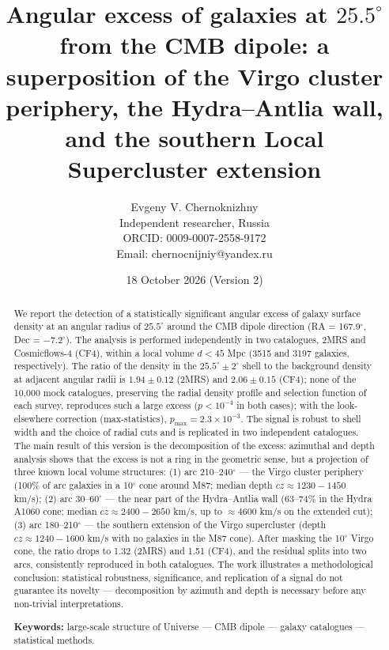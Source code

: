 \documentclass[11pt,a4paper]{article}
\title{\bfseries Angular excess of galaxies at \(25.5^\circ\) from the CMB dipole: a superposition of the Virgo cluster periphery, the Hydra--Antlia wall, and the southern Local Supercluster extension}
\author{Evgeny V. Chernoknizhny \\
\small Independent researcher, Russia \\
\small ORCID: 0009-0007-2558-9172 \\
\small Email: chernocnijniy@yandex.ru}
\date{18 October 2026 (Version 2)}
\begin{document}
\maketitle

\begin{abstract}
We report the detection of a statistically significant angular excess of galaxy surface density at an angular radius of \(25.5^\circ\) around the CMB dipole direction (RA = 167.9\(^\circ\), Dec = \(-7.2^\circ\)). The analysis is performed independently in two catalogues, 2MRS and Cosmicflows-4 (CF4), within a local volume \(d < 45\) Mpc (3515 and 3197 galaxies, respectively). The ratio of the density in the \(25.5^\circ \pm 2^\circ\) shell to the background density at adjacent angular radii is \(1.94 \pm 0.12\) (2MRS) and \(2.06 \pm 0.15\) (CF4); none of the 10,000 mock catalogues, preserving the radial density profile and selection function of each survey, reproduces such a large excess (\(p < 10^{-4}\) in both cases); with the look-elsewhere correction (max-statistics), \(p_{\max} = 2.3 \times 10^{-3}\). The signal is robust to shell width and the choice of radial cuts and is replicated in two independent catalogues. The main result of this version is the decomposition of the excess: azimuthal and depth analysis shows that the excess is not a ring in the geometric sense, but a projection of three known local volume structures: (1) arc 210--240\(^\circ\) --- the Virgo cluster periphery (100\% of arc galaxies in a 10\(^\circ\) cone around M87; median depth \(cz \approx 1230-1450\) km/s); (2) arc 30--60\(^\circ\) --- the near part of the Hydra--Antlia wall (63--74\% in the Hydra A1060 cone; median \(cz \approx 2400-2650\) km/s, up to \(\approx 4600\) km/s on the extended cut); (3) arc 180--210\(^\circ\) --- the southern extension of the Virgo supercluster (depth \(cz \approx 1240-1600\) km/s with no galaxies in the M87 cone). After masking the 10\(^\circ\) Virgo cone, the ratio drops to 1.32 (2MRS) and 1.51 (CF4), and the residual splits into two arcs, consistently reproduced in both catalogues. The work illustrates a methodological conclusion: statistical robustness, significance, and replication of a signal do not guarantee its novelty --- decomposition by azimuth and depth is necessary before any non-trivial interpretations.

\vspace{6pt}
\noindent\textbf{Keywords:} large-scale structure of Universe --- CMB dipole --- galaxy catalogues --- statistical methods.
\end{abstract}
\end{document}
